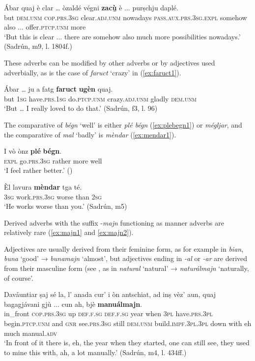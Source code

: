 \ea
\label{ex:zacù1}
\gll Ábar quaj è clar … òzaldé végni \textbf{zacù̱} è ...  purṣchju daplé.   \\
	but \textsc{dem.unm} \textsc{cop.prs.3sg} clear.\textsc{adj.unm} {} nowadays \textsc{pass.aux.prs.3sg.expl} somehow also ... offer.\textsc{ptcp.unm} more\\
\glt `But this is clear ... there are somehow also much more possibilities nowadays.' (Sadrún, m9, l. 1804f.)
\z

These adverbs can be modified by other adverbs or by adjectives used adverbially, as is the case of \textit{faruct} `crazy' in (\ref{ex:faruct1}).

\ea
\label{ex:faruct1}
\gll  Ábar … ju a fatg \textbf{faruct} \textbf{ugèn} quaj.\\
but {} \textsc{1sg} have.\textsc{prs.1sg} do.\textsc{ptcp.unm} crazy.\textsc{adj.unm} gladly \textsc{dem.unm} \\ 
\glt `But … I really loved to do that.' (Sadrún, f3, l. 96)
\z

The comparative of \textit{bégn} `well' is either \textit{plé bégn} (\ref{ex:plebegn1}) or \textit{mégljar}, and the comparative of \textit{mal} `badly' is \textit{mèndar} (\ref{ex:mendar1}).

\ea
\label{ex:plebegn1}
\gll  I vò ònz \textbf{plé} \textbf{bégn}. \\
\textsc{expl} go.\textsc{prs.3sg} rather more well\\
\glt `I feel rather better.' ()
\z

\ea
\label{ex:mendar1}
\gll Èl lavura \textbf{mèndar} tga té.\\
\textsc{3sg} work.\textsc{prs.3sg} worse than \textsc{2sg}\\
\glt `He works worse than you.' (Sadrún, m5)
\z

Derived adverbs with the suffix -\textit{majn} functioning as manner adverbs are relatively rare (\ref{ex:majn1} and \ref{ex:majn2}).

Adjectives are usually derived from their feminine form, as for example in \textit{bian}, \textit{buna} `good' → \textit{bunamajn} `almost', but adjectives ending in \textit{-al} or \textit{-ar} are derived from their masculine form (see \citet[494]{Spescha1989}, as in \textit{natural} `natural' → \textit{naturálmajn} `naturally, of course'.

\ea
\label{ex:majn1}
\gll Daváuntiar ṣaj sé la, l’ anada cur' i òn antschiat, ad inṣ vèz’ aun, quaj bagagjávani gjù ... cun ah, bjè \textbf{manuálmajn}.   \\
in\_front  \textsc{cop.prs.3sg} up \textsc{def.f.sg} \textsc{def.f.sg} year when \textsc{3pl} have.\textsc{prs.3pl} begin.\textsc{ptcp.unm} and \textsc{gnr}  see.\textsc{prs.3sg} still  \textsc{dem.unm} build.\textsc{impf.3pl.3pl} down {} with eh much manual.\textsc{adv}\\
\glt `In front of it there is, eh, the year when they started, one can still see, they used to mine this with, ah, a lot manually.' (Sadrún, m4, l. 434ff.)
\z

